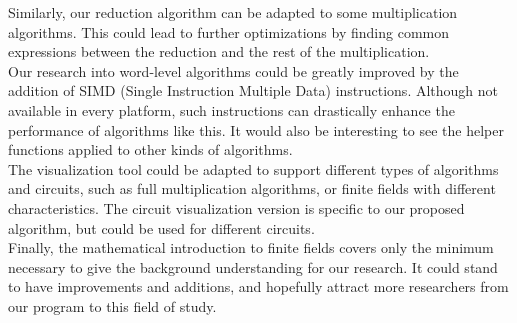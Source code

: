 Similarly, our reduction algorithm can be adapted to some multiplication algorithms. This could lead to further optimizations by finding common expressions between the reduction and the rest of the multiplication. \\

Our research into word-level algorithms could be greatly improved by the addition of SIMD (Single Instruction Multiple Data) instructions. Although not available in every platform, such instructions can drastically enhance the performance of algorithms like this. It would also be interesting to see the helper functions applied to other kinds of algorithms. \\

The visualization tool could be adapted to support different types of algorithms and circuits, such as full multiplication algorithms, or finite fields with different characteristics. The circuit visualization version is specific to our proposed algorithm, but could be used for different circuits. \\

Finally, the mathematical introduction to finite fields covers only the minimum necessary to give the background understanding for our research. It could stand to have improvements and additions, and hopefully attract more researchers from our program to this field of study.